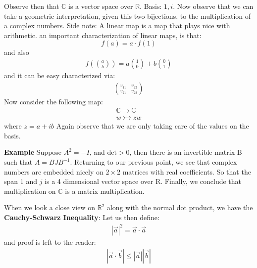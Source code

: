  Observe then that $ \mathbb{C} $ is a vector space over $ \mathbb{R } $. Basis: $1,i$. Now observe that we can take a geometric interpretation, given this two bijections, to the multiplication of a complex numbers.
 Side note: A linear map is a map that plays nice with arithmetic.
 an important characterization of linear maps, is that:
 \[ f(a) = a\cdot f(1) \]
 and also
 \begin{align*}
 f\left( \binom{a}{b} \right) = a \binom{1}{0} + b \binom{0}{1}
 \end{align*}
 and it can be easy characterized via:
 \begin{align*}
 \binom{v_{11} \quad v_{22}}{v_{21} \quad v_{22}}
 \end{align*}
 Now consider the following map:
\begin{align*}
\mathbb{C} \rightarrow \mathbb{C} \\
w \rightarrowtail zw
\end{align*}
where $z = a + ib$
Again observe that we are only taking care of the values on the basis.

\textbf{Example} Suppose $A^2 =  -I$, and $ \textrm{det} > 0 $, then there is an invertible matrix B such that $ A = BJB^{-1}$.
Returning to our previous point, we see that complex numbers are embedded nicely on $ 2 \times 2 $ matrices with real coefficients. So that the span $1$ and  $j$ is a 4 dimensional vector space over R. Finally, we conclude that multiplication on $\mathbb{C} $ is a matrix multiplication.

When we look a close view on $ \mathbb{R}^2 $ along with the normal dot product, we have the \textbf{Cauchy-Schwarz Inequality}:
Let us then define:
\begin{align*}
|\vec{a}|^2 = \vec{a}\cdot \vec{a}
\end{align*} 
and proof is left to the reader:
\begin{align*}
|\vec{a}\cdot \vec{b}| \leq |\vec{a}||\vec{b}|
\end{align*}